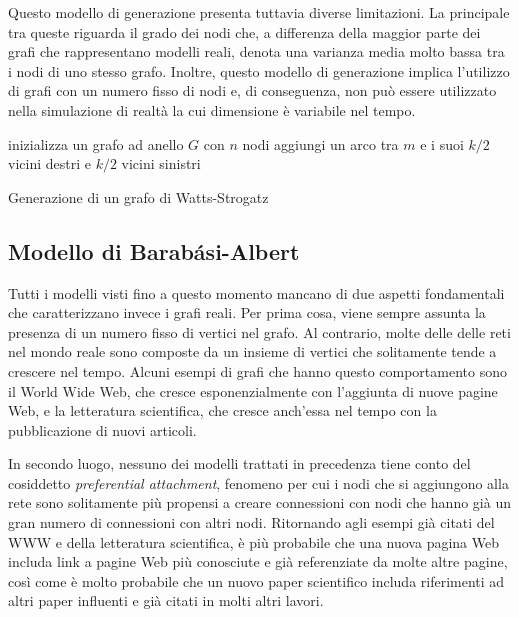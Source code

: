 Questo modello di generazione presenta tuttavia diverse limitazioni. La principale tra queste riguarda il grado dei nodi che, a differenza della maggior parte dei grafi che rappresentano modelli reali, denota una varianza media molto bassa tra i nodi di uno stesso grafo. Inoltre, questo modello di generazione implica l'utilizzo di grafi con un numero fisso di nodi e, di conseguenza, non può essere utilizzato nella simulazione di realtà la cui dimensione è variabile nel tempo.

\begin{algorithm}
\SetAlgoLined
{}
 inizializza un grafo ad anello $G$ con $n$ nodi\;
  {
 	aggiungi un arco tra $m$ e i suoi $k/2$ vicini destri e $k/2$ vicini sinistri\;
 }
 \caption{Generazione di un grafo di Watts-Strogatz}
 \label{alg:wsg}
\end{algorithm}

\subsection{Modello di Barabási-Albert}
Tutti i modelli visti fino a questo momento mancano di due aspetti fondamentali che caratterizzano invece i grafi reali. Per prima cosa, viene sempre assunta la presenza di un numero fisso di vertici nel grafo. Al contrario, molte delle delle reti nel mondo reale sono composte da un insieme di vertici che solitamente tende a crescere nel tempo. Alcuni esempi di grafi che hanno questo comportamento sono il World Wide Web, che cresce esponenzialmente con l'aggiunta di nuove pagine Web, e la letteratura scientifica, che cresce anch'essa nel tempo con la pubblicazione di nuovi articoli. 

In secondo luogo, nessuno dei modelli trattati in precedenza tiene conto del cosiddetto \textit{preferential attachment}, fenomeno per cui i nodi che si aggiungono alla rete sono solitamente più propensi a creare connessioni con nodi che hanno già un gran numero di connessioni con altri nodi. Ritornando agli esempi già citati del WWW e della letteratura scientifica, è più probabile che una nuova pagina Web includa link a pagine Web più conosciute e già referenziate da molte altre pagine, così come è molto probabile che un nuovo paper scientifico includa riferimenti ad altri paper influenti e già citati in molti altri lavori. 

